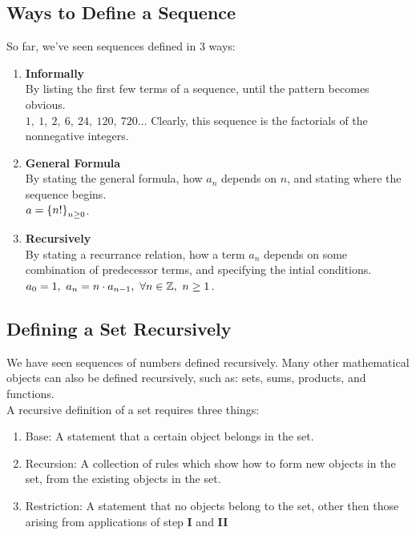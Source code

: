 \documentclass{report}
\begin{document}
\subsection*{Ways to Define a Sequence}
So far, we've seen sequences defined in 3 ways:
\begin{enumerate}
	\item \textbf{Informally} \\ By listing the first few terms of a sequence, until the pattern becomes obvious. \\ $1,\ 1,\ 2,\ 6,\ 24,\ 120,\ 720\dots$ Clearly, this sequence is the factorials of the nonnegative integers.
	\item \textbf{General Formula} \\ By stating the general formula, how $a_n$ depends on $n$, and stating where the sequence begins. \\ $a = \left\lbrace n! \right\rbrace_{n\geq0}$.
	\item \textbf{Recursively} \\ By stating a recurrance relation, how a term $a_n$ depends on some combination of predecessor terms, and specifying the intial conditions. \\ $a_0 = 1,\ a_n = n \cdot a_{n-1},\ \forall n\in\mathbb{Z},\ n\geq1$.
\end{enumerate}

\subsection*{Defining a Set Recursively}
We have seen sequences of numbers defined recursively. Many other mathematical objects can also be defined recursively, such as: sets, sums, products, and functions. \\

A recursive definition of a set requires three things:
\begin{enumerate}[label=\textbf{\Roman*}]
	\item Base: A statement that a certain object belongs in the set. \\
	\item Recursion: A collection of rules which show how to form new objects in the set, from the existing objects in the set.
	\item Restriction: A statement that no objects belong to the set, other then those arising from applications of step \textbf{I} and \textbf{II}
\end{enumerate}
\end{document}
